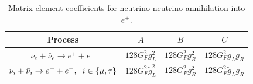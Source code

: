 \begin{table}[ht]
\centering 
\begin{tabular}{|c|c|c|c|}
\hline
Process &$A$&$B$&$C$  \\
\hline
$\nu_e+\bar\nu_e\rightarrow e^++e^-$&$128G_F^2g_L^2$&$128G_F^2g_R^2$&$128G_F^2g_Lg_R$\\
\hline
$\nu_i+\bar\nu_i\rightarrow e^++e^-,\hspace{2mm} i\in\{\mu,\tau\}$&$128G_F^2\tilde g_L^2$&$128G_F^2g_R^2$&$128G_F^2\tilde g_Lg_R$\\
\hline
\end{tabular}
\caption{Matrix element coefficients for neutrino neutrino annihilation into $e^\pm$.}
\label{table:nu_nubar_ee_coeff}
\end{table}



